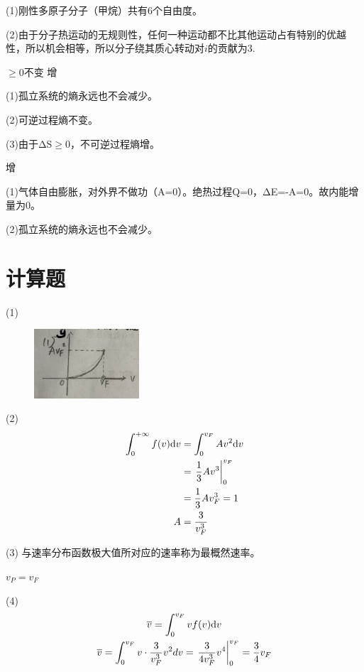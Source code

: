 
\solve (1)刚性多原子分子（甲烷）共有6个自由度。

(2)由于分子热运动的无规则性，任何一种运动都不比其他运动占有特别的优越性，所以机会相等，所以分子绕其质心转动对$i$的贡献为3.

\exercise $\geqslant 0 $\qquad 不变 \qquad 增

\solve
(1)孤立系统的熵永远也不会减少。

(2)可逆过程熵不变。

(3)由于ΔS$\geqslant 0$，不可逆过程熵增。


 \qquad 增

\solve(1)气体自由膨胀，对外界不做功（A=0）。绝热过程Q=0，ΔE=-A=0。故内能增量为0。

(2)孤立系统的熵永远也不会减少。


\section{计算题}
\exercise

\solve
(1)
\begin{figure}[!ht]
	\centering
	\includegraphics[width=0.35\textwidth]{Chp12_21.jpg}
\end{figure}

(2)
\begin{align*}
\int _ { 0 } ^ {+\infty}f(v)\mathrm{d}v
&=\int _ { 0 } ^ {v_F}Av^2\mathrm{d}v\\
&=\left. \dfrac { 1 } { 3 } A v ^ { 3 } \right| _ { 0 } ^ { v _ { F } }\\
&=\dfrac { 1 } { 3 } A v_F^3= 1 \\ 
A&=\dfrac{3}{ v_F^3 }
\end{align*}

(3)
与速率分布函数极大值所对应的速率称为最概然速率。

\therefore $v_P=v_F$

(4)
\begin{gather*}
{\overline{ v } = \int _ { 0 } ^ { v _ { F } } v f ( v )\mathrm{d}v} \\
 {\overline{ v } = \int _ { 0 } ^ { v _ { F } } v \cdot \frac { 3 } { v _ { F } ^ { 3 } } v ^ { 2 } d v = \left. \frac { 3 } { 4 v _ { F } ^ { 3 } } v ^ { 4 } \right| _ { 0 } ^ { v _ { F } } = \frac { 3 } { 4 } v _ { F } } 
\end{gather*}


